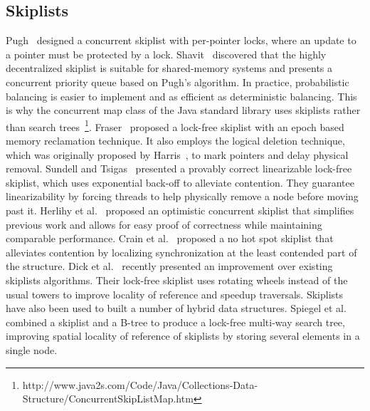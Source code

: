 \documentclass[10pt,conference,compsocconf]{IEEEtran}
\begin{document}
\subsection{Skiplists}
Pugh~\cite{pugh1990concurrent} designed a concurrent skiplist with per-pointer locks, where an update to a pointer must be protected by a lock. 
Shavit~\cite{shavit1999scalable} discovered that the highly decentralized skiplist is suitable for shared-memory systems and presents a concurrent priority queue based on Pugh's algorithm. 
In practice, probabilistic balancing is easier to implement and as efficient as deterministic balancing.
This is why the concurrent map class of the Java standard library uses skiplists rather than search trees~\footnote{http://www.java2s.com/Code/Java/Collections-Data-Structure/ConcurrentSkipListMap.htm}.
Fraser~\cite{fraser2004practical} proposed a lock-free skiplist with an epoch based memory reclamation technique.
It also employs the logical deletion technique, which was originally proposed by Harris~\cite{harris2001pragmatic}, to mark pointers and delay physical removal.
Sundell and Tsigas~\cite{sundell2004scalable} presented a provably correct linearizable lock-free skiplist, which uses exponential back-off to alleviate contention.
They guarantee linearizability by forcing threads to help physically remove a node before moving past it.
Herlihy et al.~\cite{herlihy2006provably} proposed an optimistic concurrent skiplist that simplifies previous work and allows for easy proof of correctness while maintaining comparable performance.
Crain et al.~\cite{crain2013no} proposed a no hot spot skiplist that alleviates contention by localizing synchronization at the least contended part of the structure.
Dick et al.~\cite{dick2014logarithmic} recently presented an improvement over existing skiplists algorithms.
Their lock-free skiplist uses rotating wheels instead of the usual towers to improve locality of reference and speedup traversals.
Skiplists have also been used to built a number of hybrid data structures.
Spiegel et al.~\cite{spiegel2010lock} combined a skiplist and a B-tree to produce a lock-free multi-way search tree, improving spatial locality of reference of skiplists by storing several elements in a single node.
\end{document}

